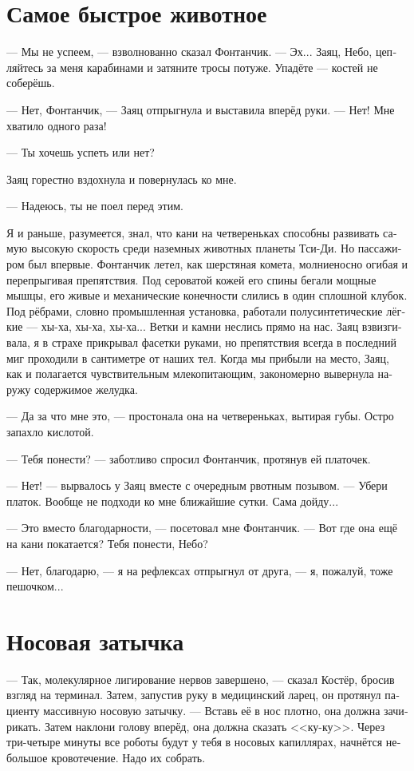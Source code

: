 \documentclass[a4paper,12pt,fleqn]{book}\usepackage{cooltooltips}\usepackage{polyglossia}\setdefaultlanguage[babelshorthands=true]{russian}\setotherlanguage{english}\defaultfontfeatures{Ligatures=TeX,Mapping=tex-text} \usepackage{xcolor}\definecolor{lightgray}{HTML}{bbbbbb}\color{lightgray}\newcommand{\ml}[3]{\textenglish{\textcolor{black}{#3}}}
\begin{document}
{\section{Самое быстрое животное}

--- Мы не успеем, --- взволнованно сказал Фонтанчик.
--- Эх...
Заяц, Небо, цепляйтесь за меня карабинами и затяните тросы потуже.
Упадёте --- костей не соберёшь.

--- Нет, Фонтанчик, --- Заяц отпрыгнула и выставила вперёд руки.
--- Нет!
Мне хватило одного раза!

--- Ты хочешь успеть или нет?

Заяц горестно вздохнула и повернулась ко мне.

--- Надеюсь, ты не поел перед этим.

Я и раньше, разумеется, знал, что кани на четвереньках способны развивать самую высокую скорость среди наземных животных планеты Тси-Ди.
Но пассажиром был впервые.
Фонтанчик летел, как шерстяная комета, молниеносно огибая и перепрыгивая препятствия.
Под сероватой кожей его спины бегали мощные мышцы, его живые и механические конечности слились в один сплошной клубок.
Под рёбрами, словно промышленная установка, работали полусинтетические лёгкие --- хы-ха, хы-ха, хы-ха...
Ветки и камни неслись прямо на нас.
Заяц взвизгивала, я в страхе прикрывал фасетки руками, но препятствия всегда в последний миг проходили в сантиметре от наших тел.
Когда мы прибыли на место, Заяц, как и полагается чувствительным млекопитающим, закономерно вывернула наружу содержимое желудка.

--- Да за что мне это, --- простонала она на четвереньках, вытирая губы.
Остро запахло кислотой.

--- Тебя понести? --- заботливо спросил Фонтанчик, протянув ей платочек.

--- Нет! --- вырвалось у Заяц вместе с очередным рвотным позывом.
--- Убери платок.
Вообще не подходи ко мне ближайшие сутки.
Сама дойду...

--- Это вместо благодарности, --- посетовал мне Фонтанчик.
--- Вот где она ещё на кани покатается?
Тебя понести, Небо?

--- Нет, благодарю, --- я на рефлексах отпрыгнул от друга, --- я, пожалуй, тоже пешочком...

\section{Носовая затычка}

--- Так, молекулярное лигирование нервов завершено, --- сказал Костёр, бросив взгляд на терминал. 
Затем, запустив руку в медицинский ларец, он протянул пациенту массивную носовую затычку.
--- Вставь её в нос плотно, она должна зачирикать.
Затем наклони голову вперёд, она должна сказать <<ку-ку>>.
Через три-четыре минуты все роботы будут у тебя в носовых капиллярах, начнётся небольшое кровотечение.
Надо их собрать.

}
\end{document}
